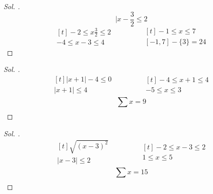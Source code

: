 \documentclass{article}
\theoremstyle{mytheoremstyle}
\theoremstyle{mytheoremstyle}
\theoremstyle{myproblemstyle}
\begin{document}
\begin{problem}
\end{problem}

\begin{proof}[\textit{ Sol. }]
  $$ |x - \frac{3}{2} \le 2 $$
  \begin{equation*}
    \begin{aligned}[t]
      -2 \le x \frac{3}{2} \le 2\\
      -4 \le x - 3 \le 4
    \end{aligned}
    \qquad\qquad
    \begin{aligned}[t]
      -1 \le x \le 7\\
      [-1, 7] - \{3\} = 24
    \end{aligned}
  \end{equation*}
\end{proof}

\begin{problem}
\end{problem}

\begin{proof}[\textit{ Sol. }]
  \begin{equation*}
    \begin{aligned}[t]
      |x + 1| - 4 \le 0\\
      |x + 1| \le 4
    \end{aligned}
    \qquad\qquad
    \begin{aligned}[t]
      -4 \le x + 1 \le 4\\
      -5 \le x \le 3
    \end{aligned}
  \end{equation*}
  $$ \sum_{}^{}x = 9 $$
\end{proof}

\begin{problem}[$ \sqrt{x^2 + 6x + 9} > 2 $ eşitliğini $ x $ tamsayı değerleri toplamı? (sağlamayan = $ \le 2 $)]
\end{problem}

\begin{proof}[\textit{ Sol. }]
  \begin{equation*}
    \begin{aligned}[t]
      \sqrt{(x - 3)^2}\\
      |x - 3| \le 2
    \end{aligned}
    \qquad\qquad
    \begin{aligned}[t]
      -2 \le x - 3 \le 2\\
      1 \le x \le 5
    \end{aligned}
  \end{equation*}
  $$ \sum_{}^{}x = 15 $$
\end{proof}
\end{document}
